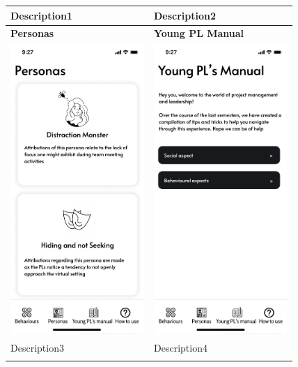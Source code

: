 \begin{longtable}[ht]{ p{}  p{} }
   \hline
   Description1  &  Description2  \\
   \hline
   \textbf{Personas} & \textbf{Young PL Manual}\\
    \hline
   \includegraphics[valign=t, width=2in]{figures/Personas.pdf} &   		\includegraphics[valign=t, width=2in]{figures/HowTo.pdf} \\
   \hline
   Description3  &  Description4  \\
   \hline
\label{tab:multicol}
\end{longtable}


